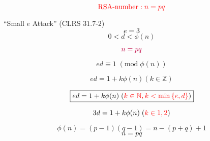 \begin{frame}
\end{frame}

\begin{frame}
  \[
	\textcolor{red}{\text{RSA-number}: n = p q}
  \]

\end{frame}

\begin{frame}
  \begin{exampleblock}{``Small $e$ Attack'' (CLRS $31.7$-$2$)}
	\[
	  e = 3
	\]
	\[
	  0 < d < \phi(n)
	\]

	\pause
	\vspace{-0.30cm}
	\[
	  \textcolor{purple}{n = pq}
	\]
  \end{exampleblock}

  \pause
  \begin{center}
  \end{center}

  \pause
  \begin{center}
  \end{center}
  \end{frame}

\begin{frame}
  \[
	ed \equiv 1 \;(\text{mod}\; \phi(n))
  \]

  \pause
  \[
	ed = 1 + k \phi(n) (k \in \mathbb{Z})
  \]

  \pause
  \[
	\boxed{ed = 1 + k \phi(n) \;(\textcolor{red}{k \in \mathbb{N}, k < \min\left\{ e, d \right\}})}
  \]

  \pause
  \[
	3d = 1 + k \phi(n) \;(\textcolor{red}{k \in {1, 2}})
  \]

  \pause
  \[
	\phi(n) = (p-1)(q-1) = n - (p + q) + 1
  \]
  \[
	n = pq
  \]
\end{frame}


